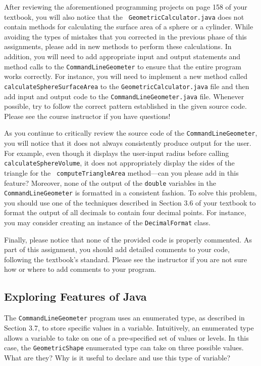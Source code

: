 \begin{sloppypar}
After reviewing the aforementioned programming projects on page 158 of your textbook, you will also notice that the {\tt
  GeometricCalculator.java} does not contain methods for calculating the surface area of a sphere or a cylinder.  While
avoiding the types of mistakes that you corrected in the previous phase of this assignments, please add in new methods
to perform these calculations. In addition, you will need to add appropriate input and output statements and method
calls to the {\tt CommandLineGeometer} to ensure that the entire program works correctly. For instance, you will need to
implement a new method called {\tt calculateSphereSurfaceArea} to the {\tt GeometricCalculator.java} file and then add
input and output code to the {\tt CommandLineGeometer.java} file. Whenever possible, try to follow the correct
pattern established in the given source code. Please see the course instructor if you have questions!
\end{sloppypar}

As you continue to critically review the source code of the {\tt CommandLineGeometer}, you will notice that it does not
always consistently produce output for the user.  For example, even though it displays the user-input radius before
calling {\tt calculateSphereVolume}, it does not appropriately display the sides of the triangle for the {\tt
  computeTriangleArea} method---can you please add in this feature? Moreover, none of the output of the {\tt double}
variables in the {\tt CommandLineGeometer} is formatted in a consistent fashion. To solve this problem, you should use
one of the techniques described in Section 3.6 of your textbook to format the output of all decimals to contain four
decimal points. For instance, you may consider creating an instance of the {\tt DecimalFormat} class.

Finally, please notice that none of the provided code is properly commented.  As part of this assignment, you should add
detailed comments to your code, following the textbook's standard. Please see the instructor if you are
not sure how or where to add comments to your program.

\vspace*{-.1in}
\subsection*{Exploring Features of Java}

The {\tt CommandLineGeometer} program uses an enumerated type, as described in Section 3.7, to store specific values in
a variable.  Intuitively, an enumerated type allows a variable to take on one of a pre-specified set of values or
levels.  In this case, the {\tt GeometricShape} enumerated type can take on three possible values.  What are they? Why
is it useful to declare and use this type of variable?

